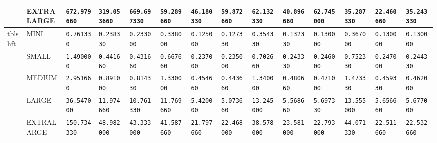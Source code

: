 \begin{tabular}{l | l | l | l | l | l | l | l | l | l | l | l | l | l}
             & EXTRALARGE & \verb|672.979660   | & \verb|319.053660  | & \verb|669.697330  | & \verb|59.289660   | & \verb|46.180330   | & \verb|59.872660   | & \verb|62.132330   | & \verb|40.896660   | & \verb|62.745000   | & \verb|35.287330   | & \verb|22.460660   | & \verb|35.243330   | \\ \hline
    tblshft  & MINI       & \verb|0.761330     | & \verb|0.238330    | & \verb|0.233000    | & \verb|0.338000    | & \verb|0.125000    | & \verb|0.127330    | & \verb|0.354330    | & \verb|0.132330    | & \verb|0.130000    | & \verb|0.367000    | & \verb|0.130000    | & \verb|0.130000    | \\ \hline
             & SMALL      & \verb|1.490000     | & \verb|0.441660    | & \verb|0.431660    | & \verb|0.667660    | & \verb|0.237000    | & \verb|0.235000    | & \verb|0.702660    | & \verb|0.243330    | & \verb|0.246000    | & \verb|0.752330    | & \verb|0.247000    | & \verb|0.244330    | \\ \hline
             & MEDIUM     & \verb|2.951660     | & \verb|0.891000    | & \verb|0.814330    | & \verb|1.330000    | & \verb|0.454660    | & \verb|0.443660    | & \verb|1.340000    | & \verb|0.480660    | & \verb|0.471000    | & \verb|1.473330    | & \verb|0.459330    | & \verb|0.462000    | \\ \hline
             & LARGE      & \verb|36.547000    | & \verb|11.974660   | & \verb|10.761330   | & \verb|11.769660   | & \verb|5.420000    | & \verb|5.073660    | & \verb|13.245000   | & \verb|5.568660    | & \verb|5.697330    | & \verb|13.555000   | & \verb|5.656660    | & \verb|5.677000    | \\ \hline
             & EXTRALARGE & \verb|150.734330   | & \verb|48.982000   | & \verb|43.333000   | & \verb|41.587660   | & \verb|21.797660   | & \verb|22.468000   | & \verb|38.578000   | & \verb|23.581000   | & \verb|22.793000   | & \verb|44.071330   | & \verb|22.511660   | & \verb|22.532660   | \\ \hline
\end{tabular}
